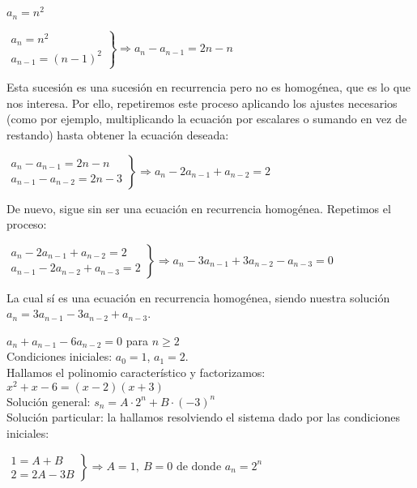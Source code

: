 \begin{ejemplo}
    $a_n = n^2$ \\
    \begin{center}
        $\left.
            \begin{aligned}
                a_n = n^2 \\
                a_{n-1} = (n-1)^2
            \end{aligned} \right \}
            \Rightarrow a_n - a_{n-1} = 2n -n$
    \end{center}
    Esta sucesión es una sucesión en recurrencia pero no es homogénea, que es lo que nos interesa. Por ello, repetiremos este proceso aplicando los ajustes necesarios (como por ejemplo, multiplicando la ecuación por escalares o sumando en vez de restando) hasta obtener la ecuación deseada:
    \begin{center}
        $\left.
            \begin{aligned}
                a_n - a_{n-1} = 2n -n \\
                a_{n-1} - a_{n-2} = 2n -3
            \end{aligned} \right \}
            \Rightarrow a_n -2a_{n-1} +a_{n-2} = 2$
    \end{center}
    De nuevo, sigue sin ser una ecuación en recurrencia homogénea. Repetimos el proceso:
    \begin{center}
        $\left.
            \begin{aligned}
                a_n -2a_{n-1} +a_{n-2} = 2 \\
                a_{n-1} -2a_{n-2} +a_{n-3} = 2
            \end{aligned} \right \}
            \Rightarrow a_n -3a_{n-1} +3a_{n-2} -a_{n-3} = 0$
    \end{center}
    La cual sí es una ecuación en recurrencia homogénea, siendo nuestra solución $a_n = 3a_{n-1} -3a_{n-2} +a_{n-3}$.
\end{ejemplo}

\begin{ejemplo} $a_{n} + a_{n-1} -6a_{n-2} = 0$ para $n \geq 2$ \\
    Condiciones iniciales: $a_{0} = 1$, $a_{1} = 2$.\\
    Hallamos el polinomio característico y factorizamos: $x^2 + x -6 = (x-2)(x+3)$\\
    Solución general: $s_{n} = A \cdot 2^{n} + B \cdot (-3)^{n}$ \\
    Solución particular: la hallamos resolviendo el sistema dado por las condiciones iniciales:
    \begin{center}
        $\left.
            \begin{aligned}
                1 = A + B \\
                2 = 2A - 3B
            \end{aligned} \right \}
            \Rightarrow A = 1, \ B = 0 \text{ de donde } a_n = 2^n$
    \end{center}
\end{ejemplo}
\smallskip

